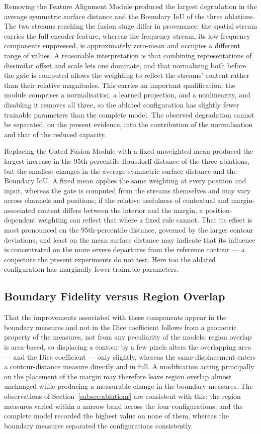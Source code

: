Removing the Feature Alignment Module produced the largest degradation in the average symmetric surface distance and the Boundary IoU of the three ablations. The two streams reaching the fusion stage differ in provenance: the spatial stream carries the full encoder feature, whereas the frequency stream, its low-frequency components suppressed, is approximately zero-mean and occupies a different range of values. A reasonable interpretation is that combining representations of dissimilar offset and scale lets one dominate, and that normalising both before the gate is computed allows the weighting to reflect the streams' content rather than their relative magnitudes. This carries an important qualification: the module comprises a normalisation, a learned projection, and a nonlinearity, and disabling it removes all three, so the ablated configuration has slightly fewer trainable parameters than the complete model. The observed degradation cannot be separated, on the present evidence, into the contribution of the normalisation and that of the reduced capacity.

Replacing the Gated Fusion Module with a fixed unweighted mean produced the largest increase in the 95th-percentile Hausdorff distance of the three ablations, but the smallest changes in the average symmetric surface distance and the Boundary IoU. A fixed mean applies the same weighting at every position and input, whereas the gate is computed from the streams themselves and may vary across channels and positions; if the relative usefulness of contextual and margin-associated content differs between the interior and the margin, a position-dependent weighting can reflect that where a fixed rule cannot. That its effect is most pronounced on the 95th-percentile distance, governed by the larger contour deviations, and least on the mean surface distance may indicate that its influence is concentrated on the more severe departures from the reference contour --- a conjecture the present experiments do not test. Here too the ablated configuration has marginally fewer trainable parameters.

\subsection{Boundary Fidelity versus Region Overlap}

That the improvements associated with these components appear in the boundary measures and not in the Dice coefficient follows from a geometric property of the measures, not from any peculiarity of the models: region overlap is area-based, so displacing a contour by a few pixels alters the overlapping area --- and the Dice coefficient --- only slightly, whereas the same displacement enters a contour-distance measure directly and in full. A modification acting principally on the placement of the margin may therefore leave region overlap almost unchanged while producing a measurable change in the boundary measures. The observations of Section~\ref{subsec:ablationr} are consistent with this: the region measures varied within a narrow band across the four configurations, and the complete model recorded the highest value on none of them, whereas the boundary measures separated the configurations consistently.

